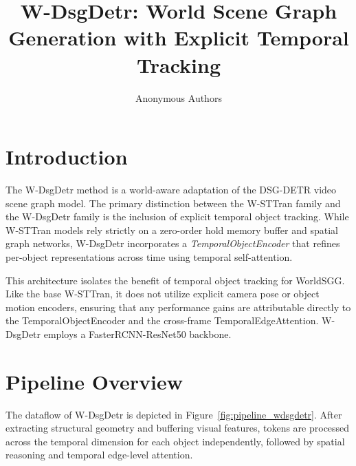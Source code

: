 \documentclass{article}
\title{W-DsgDetr: World Scene Graph Generation with Explicit Temporal Tracking}
\author{Anonymous Authors}
\begin{document}
\maketitle

\section{Introduction}
\label{sec:intro}

The W-DsgDetr method is a world-aware adaptation of the DSG-DETR video scene graph model. The primary distinction between the W-STTran family and the W-DsgDetr family is the inclusion of explicit temporal object tracking. While W-STTran models rely strictly on a zero-order hold memory buffer and spatial graph networks, W-DsgDetr incorporates a \emph{TemporalObjectEncoder} that refines per-object representations across time using temporal self-attention.

This architecture isolates the benefit of temporal object tracking for WorldSGG. Like the base W-STTran, it does not utilize explicit camera pose or object motion encoders, ensuring that any performance gains are attributable directly to the TemporalObjectEncoder and the cross-frame TemporalEdgeAttention. W-DsgDetr employs a FasterRCNN-ResNet50 backbone.

\section{Pipeline Overview}
\label{sec:pipeline}

The dataflow of W-DsgDetr is depicted in Figure~\ref{fig:pipeline_wdsgdetr}. After extracting structural geometry and buffering visual features, tokens are processed across the temporal dimension for each object independently, followed by spatial reasoning and temporal edge-level attention.
\end{document}
